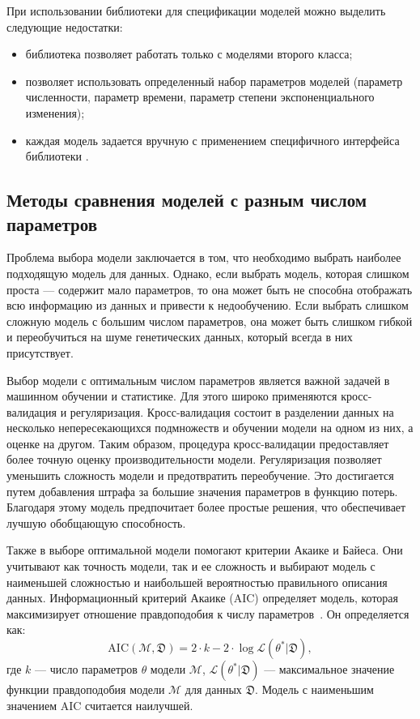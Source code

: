 При использовании библиотеки \momi для спецификации моделей можно выделить следующие недостатки:
\begin{itemize}
    \item библиотека позволяет работать только с моделями второго класса;
    \item позволяет использовать определенный набор параметров моделей (параметр численности, параметр времени, параметр степени экспоненциального изменения);
    \item каждая модель задается вручную с применением специфичного интерфейса библиотеки \momi.
\end{itemize}



\subsection{Методы сравнения моделей с разным числом параметров}
\label{sec:part1:bioinf_methods:model_comp}

Проблема выбора модели заключается в том, что необходимо выбрать наиболее подходящую модель для данных.
Однако, если выбрать модель, которая слишком проста --- содержит мало параметров, то она может быть не способна отображать всю информацию из данных и привести к недообучению.
Если выбрать слишком сложную модель с большим числом параметров, она может быть слишком гибкой и переобучиться на шуме генетических данных, который всегда в них присутствует.

Выбор модели с оптимальным числом параметров является важной задачей в машинном обучении и статистике.
Для этого широко применяются кросс-валидация и регуляризация.
Кросс-валидация состоит в разделении данных на несколько непересекающихся подмножеств и обучении модели на одном из них, а оценке на другом.
Таким образом, процедура кросс-валидации предоставляет более точную оценку производительности модели.
Регуляризация позволяет уменьшить сложность модели и предотвратить переобучение.
Это достигается путем добавления штрафа за большие значения параметров в функцию потерь.
Благодаря этому модель предпочитает более простые решения, что обеспечивает лучшую обобщающую способность.

Также в выборе оптимальной модели помогают критерии Акаике и Байеса.
Они учитывают как точность модели, так и ее сложность и выбирают модель с наименьшей сложностью и наибольшей вероятностью правильного описания данных.
Информационный критерий Акаике (AIC) определяет модель, которая максимизирует отношение правдоподобия к числу параметров~\cite{akaike1974new}.
Он определяется как:
$$\textrm{AIC}(\mathcal{M},\mathfrak{D}) = 2\cdot k - 2\cdot \log\mathcal{L}(\theta^* | \mathfrak{D}),$$
где $k$ --- число параметров $\theta$ модели $\mathcal{M}$, $\mathcal{L}(\theta^* | \mathfrak{D})$ --- максимальное значение функции правдоподобия модели $\mathcal{M}$ для данных $\mathfrak{D}$.
Модель с наименьшим значением AIC считается наилучшей.

